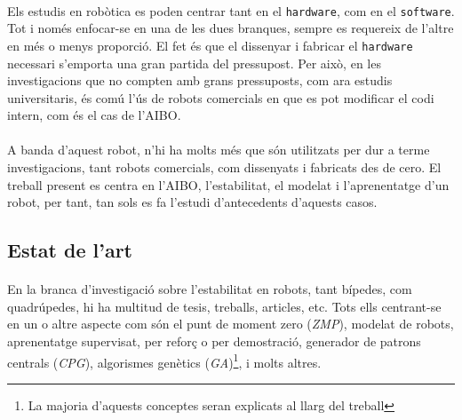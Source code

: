 \documentclass[12pt,a4paper,final,twoside]{article}
\begin{document}
\paragraph{}Els estudis en robòtica es poden centrar tant en el \texttt{hardware}, com en el \texttt{software}. Tot i només enfocar-se en una de les dues branques, sempre es requereix de l'altre en més o menys proporció. El fet és que el dissenyar i fabricar el \texttt{hardware} necessari s'emporta una gran partida del pressupost. Per això, en les investigacions que no compten amb grans pressuposts, com ara estudis universitaris, és comú l'ús de robots comercials en que es pot modificar el codi intern, com és el cas de l'AIBO.

\paragraph{}A banda d'aquest robot, n'hi ha molts més que són utilitzats per dur a terme investigacions, tant robots comercials, com dissenyats i fabricats des de cero. El treball present es centra en l'AIBO, l'estabilitat, el modelat i l'aprenentatge d'un robot, per tant, tan sols es fa l'estudi d'antecedents d'aquests casos.

\label{Estat-de-l'art}
\subsection*{Estat de l'art}

\paragraph{}En la branca d'investigació sobre l'estabilitat en robots, tant bípedes, com quadrúpedes, hi ha multitud de tesis, treballs, articles, etc. Tots ells centrant-se en un o altre aspecte com són el punt de moment zero (\textit{ZMP}), modelat de robots, aprenentatge supervisat, per reforç o per demostració, generador de patrons centrals (\textit{CPG}), algorismes genètics (\textit{GA})\footnote{La majoria d'aquests conceptes seran explicats al llarg del treball}, i molts altres.
\end{document}
